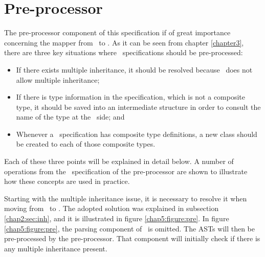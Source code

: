 \section{Pre-processor}
\label{chap5:preproc}

The pre-processor component of this specification if of great importance concerning the mapper from \vpp\ to \jml. As it can be seen from chapter \ref{chapter3}, there are three key situations where \vpp\ specifications should be pre-processed: 
\begin{itemize}
\item If there exists multiple inheritance, it should be resolved because \jml\ does not allow multiple inheritance;
\item If there is type information in the specification, which is not a composite type, it should be saved into an intermediate structure in order to consult the name of the type at the \jml\ side; and
\item Whenever a \vpp\ specification has composite type definitions, a new class should be created to each of those composite types.
\end{itemize}

Each of these three points will be explained in detail below. A number of operations from the \vpp\ specification of the pre-processor are shown to illustrate how these concepts are used in practice.

Starting with the multiple inheritance issue, it is necessary to resolve it when moving from \vpp\ to \jml. The adopted solution was explained in subsection \ref{chap2:sec:inh}, and it is illustrated in figure \ref{chap5:figure:pre}. In figure \ref{chap5:figure:pre}, the parsing component of \vpp\ is omitted. The ASTs will then be pre-processed by the pre-processor. That component will initially check if there is any multiple inheritance present. 

